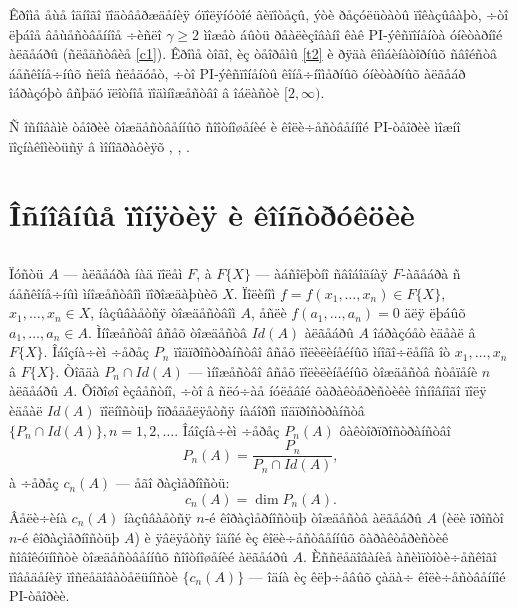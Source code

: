 \documentclass{article}
\numberwithin{equation}{section}
\theoremstyle{plain}
\theoremstyle{definition}
\begin{document}
\begin{fulltext}
Êðîìå åùå îäíîãî ïîäòâåðæäåíèÿ óïîëÿíóòîé ãèïîòåçû, ýòè ðåçóëüòàòû ïîêàçûâàþò, ÷òî
ëþáîå âåùåñòâåííîå ÷èñëî $\gamma \ge 2$ ìîæåò áûòü ðåàëèçîâàíî êàê PI-ýêñïîíåíòà
óíèòàðíîé àëãåáðû (ñëåäñòâèå \ref{c1}). Êðîìå òîãî, èç òåîðåìû \ref{t2} è ðÿäà 
êîìáèíàòîðíûõ ñâîéñòâ áåñêîíå÷íûõ ñëîâ ñëåäóåò, ÷òî PI-ýêñïîíåíòû êîíå÷íîìåðíûõ
óíèòàðíûõ àëãåáð îáðàçóþò âñþäó ïëîòíîå ïîäìíîæåñòâî â îáëàñòè $[2,\infty)$.

Ñ îñíîâàìè òåîðèè òîæäåñòâåííûõ ñîîòíîøåíèé è êîëè÷åñòâåííîé PI-òåîðèè ìîæíî
ïîçíàêîìèòüñÿ â ìîíîãðàôèÿõ \cite{B}, \cite{Dren}, \cite{GZbook}.

 

\section{Îñíîâíûå ïîíÿòèÿ è êîíñòðóêöèè}\label{s2}

\subsection{}\label{s2.1}
Ïóñòü $A$ --- àëãåáðà íàä ïîëåì $F$, à $F\{X\}$ --- àáñîëþòíî ñâîáîäíàÿ $F$-àãåáðà
ñ áåñêîíå÷íûì ìíîæåñòâîì ïîðîæäàþùèõ $X$. Ïîëèíîì $f=f(x_1,\ldots, x_n)\in F\{X\}$,
$x_1,\ldots, x_n \in X$,  íàçûâàåòñÿ òîæäåñòâîì $A$, åñëè $f(a_1,\ldots, a_n)=0$
äëÿ ëþáûõ $a_1,\ldots,a_n \in A$. Ìíîæåñòâî âñåõ òîæäåñòâ $Id(A)$ àëãåáðû $A$ îáðàçóåò 
èäåàë â $F\{X\}$. Îáîçíà÷èì ÷åðåç $P_n$ ïîäïðîñòðàíñòâî âñåõ ïîëèëèíåéíûõ ìíîãî÷ëåíîâ îò
$x_1,\ldots, x_n$ â $F\{X\}$. Òîãäà $P_n\cap Id(A)$ --- ìíîæåñòâî âñåõ ïîëèëèíåéíûõ 
òîæäåñòâ ñòåïåíè $n$ àëãåáðû $A$. Õîðîøî èçâåñòíî, ÷òî â ñëó÷àå íóëåâîé õàðàêòåðèñòèêè 
îñíîâíîãî ïîëÿ èäåàë $Id(A)$ ïîëíîñòüþ îïðåäåëÿåòñÿ íàáîðîì ïîäïðîñòðàíñòâ
$\{P_n\cap Id(A)\}, n=1,2,\ldots $. Îáîçíà÷èì ÷åðåç $P_n(A)$ ôàêòîðïðîñòðàíñòâî
$$
P_n(A)=\frac{P_n}{P_n\cap Id(A)},
$$
à ÷åðåç $c_n(A)$ --- åãî ðàçìåðíîñòü:
$$
c_n(A)=\dim P_n(A).
$$
Âåëè÷èíà $c_n(A)$ íàçûâàåòñÿ $n$-é êîðàçìåðíîñòüþ òîæäåñòâ àëãåáðû $A$ (èëè ïðîñòî
$n$-é êîðàçìåðíîñòüþ $A$) è ÿâëÿåòñÿ îäíîé èç êîëè÷åñòâåííûõ õàðàêòåðèñòèê
ñîâîêóïíîñòè òîæäåñòâåííûõ ñîîòíîøåíèé àëãåáðû $A$. Èññëåäîâàíèå àñèìïòîòè÷åñêîãî ïîâåäåíèÿ 
ïîñëåäîâàòåëüíîñòè $\{c_n(A)\}$ --- îäíà èç êëþ÷åâûõ çàäà÷ êîëè÷åñòâåííîé PI-òåîðèè.


\end{fulltext}
\end{document}
